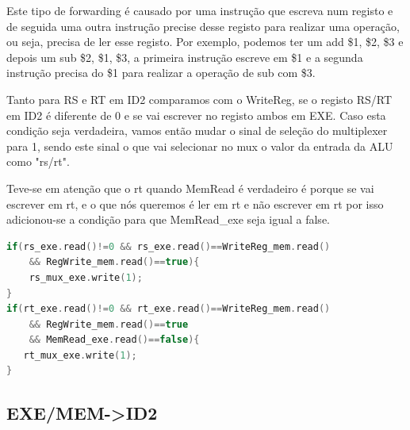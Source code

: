 \documentclass[pdftex,12pt,a4paper]{report}
\begin{document}
\begin{table}[!htb]
\centering
\label{for_ex_mem_exe}
\end{table}

Este tipo de forwarding é causado por uma instrução que escreva num registo e de seguida uma outra instrução precise desse registo para realizar uma operação, ou seja, precisa de ler esse registo. Por exemplo, podemos ter um add \$1, \$2, \$3 e depois um sub \$2, \$1, \$3, a primeira instrução escreve em \$1 e a segunda instrução precisa do \$1  para realizar a operação de sub com \$3.
\linebreak

Tanto para RS e RT em ID2 comparamos com o WriteReg, se o registo RS/RT em ID2 é diferente de 0 e se vai escrever no registo ambos em EXE. 
Caso esta condição seja verdadeira, vamos então mudar o sinal de seleção do multiplexer para 1, sendo este sinal o que vai selecionar no mux o valor da entrada da ALU como "rs/rt".

Teve-se em atenção que o rt quando MemRead é verdadeiro é porque se vai escrever em rt, e o que nós queremos é ler em rt e não escrever em rt por isso adicionou-se a condição para que MemRead\_exe seja igual a false.
\linebreak

\begin{lstlisting}[language=c]
if(rs_exe.read()!=0 && rs_exe.read()==WriteReg_mem.read() 
	&& RegWrite_mem.read()==true){
    rs_mux_exe.write(1); 
}
if(rt_exe.read()!=0 && rt_exe.read()==WriteReg_mem.read() 
	&& RegWrite_mem.read()==true 
	&& MemRead_exe.read()==false){
   rt_mux_exe.write(1);
}
\end{lstlisting} 

\subsection{EXE/MEM->ID2}
\end{document}
